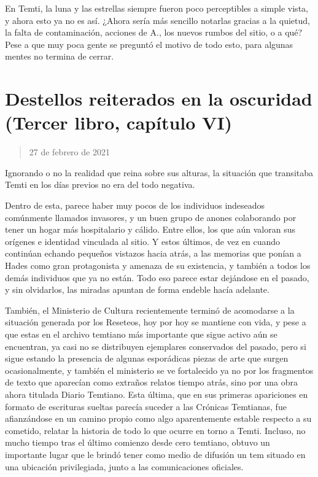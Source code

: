 \documentclass[
]{book}
\begin{document}
En Temti, la luna y las estrellas siempre fueron poco perceptibles a simple vista, y ahora esto ya no es así. ¿Ahora sería más sencillo notarlas gracias a la quietud, la falta de contaminación, acciones de A., los nuevos rumbos del sitio, o a qué? Pese a que muy poca gente se preguntó el motivo de todo esto, para algunas mentes no termina de cerrar.

\hypertarget{destellos-reiterados-en-la-oscuridad-tercer-libro-capuxedtulo-vi}{%
\section{Destellos reiterados en la oscuridad (Tercer libro, capítulo VI)}\label{destellos-reiterados-en-la-oscuridad-tercer-libro-capuxedtulo-vi}}

\begin{quote}
27 de febrero de 2021
\end{quote}

Ignorando o no la realidad que reina sobre sus alturas, la situación que transitaba Temti en los días previos no era del todo negativa.

Dentro de esta, parece haber muy pocos de los individuos indeseados comúnmente llamados invasores, y un buen grupo de anones colaborando por tener un hogar más hospitalario y cálido. Entre ellos, los que aún valoran sus orígenes e identidad vinculada al sitio. Y estos últimos, de vez en cuando continúan echando pequeños vistazos hacia atrás, a las memorias que ponían a Hades como gran protagonista y amenaza de su existencia, y también a todos los demás individuos que ya no están. Todo eso parece estar dejándose en el pasado, y sin olvidarlos, las miradas apuntan de forma endeble hacía adelante.

También, el Ministerio de Cultura recientemente terminó de acomodarse a la situación generada por los Reseteos, hoy por hoy se mantiene con vida, y pese a que estas en el archivo temtiano más importante que sigue activo aún se encuentran, ya casi no se distribuyen ejemplares conservados del pasado, pero si sigue estando la presencia de algunas esporádicas piezas de arte que surgen ocasionalmente, y también el ministerio se ve fortalecido ya no por los fragmentos de texto que aparecían como extraños relatos tiempo atrás, sino por una obra ahora titulada Diario Temtiano. Esta última, que en sus primeras apariciones en formato de escrituras sueltas parecía suceder a las Crónicas Temtianas, fue afianzándose en un camino propio como algo aparentemente estable respecto a su cometido, relatar la historia de todo lo que ocurre en torno a Temti. Incluso, no mucho tiempo tras el último comienzo desde cero temtiano, obtuvo un importante lugar que le brindó tener como medio de difusión un tem situado en una ubicación privilegiada, junto a las comunicaciones oficiales.
\end{document}
